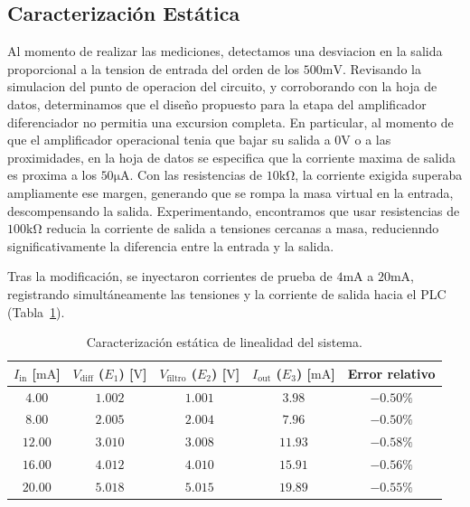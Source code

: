 \subsection{Caracterización Estática}
Al momento de realizar las mediciones, detectamos una desviacion en la salida proporcional a la tension de entrada del
orden de los $500 \si{\milli\volt}$. Revisando la simulacion del punto de operacion del circuito, y corroborando con la
hoja de datos, determinamos que el diseño propuesto para la etapa del amplificador diferenciador no permitia una
excursion completa. En particular, al momento de que el amplificador operacional tenia que bajar su salida a $0
\si{\volt}$ o a las proximidades, en la hoja de datos se especifica que la corriente maxima de salida es proxima a los
$50 \si{\micro\ampere}$. Con las resistencias de $10 \si{\kilo\ohm}$, la corriente exigida superaba ampliamente ese
margen, generando que se rompa la masa virtual en la entrada, descompensando la salida. Experimentando, encontramos que
usar resistencias de $100 \si{\kilo\ohm}$ reducia la corriente de salida a tensiones cercanas a masa, reducienndo
significativamente la diferencia entre la entrada y la salida.

Tras la modificación, se inyectaron corrientes de prueba de $4 \unit{\milli\ampere}$ a $20 \unit{\milli\ampere}$,
registrando simultáneamente las tensiones y la corriente de salida hacia el PLC (Tabla~\ref{tab.ej1:estatica}).

\begin{table}[!ht]
    \centering
    \small
    \begin{tabular}{ccccc}
        \toprule
        $I_{\text{in}}$ [$\unit{\milli\ampere}$] & $V_{\text{diff}}$ ($E_1$) [$\unit{\volt}$] & $V_{\text{filtro}}$ ($E_2$) [$\unit{\volt}$] & $I_{\text{out}}$ ($E_3$) [$\unit{\milli\ampere}$] & Error relativo \\
        \midrule
        $4.00$  & $1.002$ & $1.001$ & $3.98$  & $-0.50\%$ \\
        $8.00$  & $2.005$ & $2.004$ & $7.96$  & $-0.50\%$ \\
        $12.00$ & $3.010$ & $3.008$ & $11.93$ & $-0.58\%$ \\
        $16.00$ & $4.012$ & $4.010$ & $15.91$ & $-0.56\%$ \\
        $20.00$ & $5.018$ & $5.015$ & $19.89$ & $-0.55\%$ \\
        \bottomrule
    \end{tabular}
    \caption{Caracterización estática de linealidad del sistema.}
    \label{tab.ej1:estatica}
\end{table}

